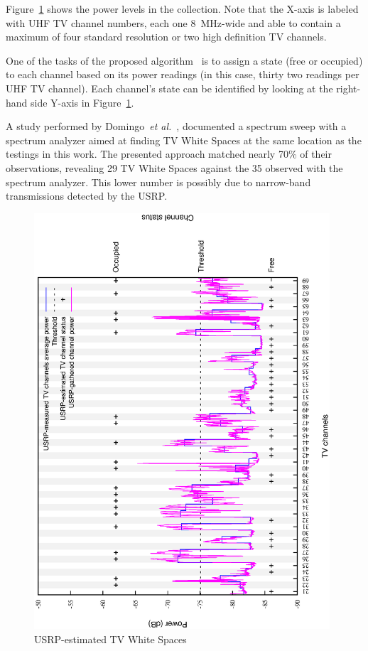 Figure~\ref{fig:tvChannels} shows the power levels in the collection. Note that the X-axis is labeled with UHF TV channel numbers, each one $8$~MHz-wide and able to contain a maximum of four standard resolution or two high definition TV channels.

One of the tasks of the proposed algorithm~\cite{sanabriaCodeUSRP} is to assign a state (free or occupied) to each channel based on its power readings (in this case, thirty two readings per UHF TV channel). Each channel's state can be identified by looking at the right-hand side Y-axis in Figure~\ref{fig:tvChannels}.

A study performed by Domingo~\emph{et al.}~\cite{domingo2012white}, documented a spectrum sweep with a spectrum analyzer aimed at finding TV White Spaces at the same location as the testings in this work. The presented approach matched nearly 70\% of their observations, revealing 29 TV White Spaces against the 35 observed with the spectrum analyzer. This lower number is possibly due to narrow-band transmissions detected by the USRP.

\begin{figure}[htbp]
  \centering
  \includegraphics[width = 11cm, angle = -90]{sect3/figures/figure1_wo_Albert.eps}
  \caption{USRP-estimated TV White Spaces}
  \label{fig:tvChannels}
\end{figure}
